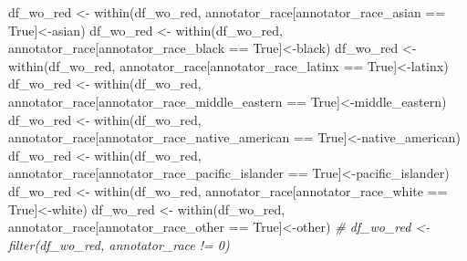 \documentclass[
]{article}
\newenvironment{Shaded}{\begin{snugshade}}{\end{snugshade}}
\newcommand{\CommentTok}[1]{\textcolor[rgb]{0.56,0.35,0.01}{\textit{#1}}}
\newcommand{\FunctionTok}[1]{\textcolor[rgb]{0.00,0.00,0.00}{#1}}
\newcommand{\NormalTok}[1]{#1}
\newcommand{\OtherTok}[1]{\textcolor[rgb]{0.56,0.35,0.01}{#1}}
\newcommand{\SpecialCharTok}[1]{\textcolor[rgb]{0.00,0.00,0.00}{#1}}
\newcommand{\StringTok}[1]{\textcolor[rgb]{0.31,0.60,0.02}{#1}}
\begin{document}
\begin{Shaded}
\begin{Highlighting}[]
\NormalTok{df\_wo\_red }\OtherTok{\textless{}{-}} \FunctionTok{within}\NormalTok{(df\_wo\_red, annotator\_race[annotator\_race\_asian }\SpecialCharTok{==} \StringTok{\textquotesingle{}True\textquotesingle{}}\NormalTok{]}\OtherTok{\textless{}{-}}\StringTok{\textquotesingle{}asian\textquotesingle{}}\NormalTok{)}
\NormalTok{df\_wo\_red }\OtherTok{\textless{}{-}} \FunctionTok{within}\NormalTok{(df\_wo\_red, annotator\_race[annotator\_race\_black }\SpecialCharTok{==} \StringTok{\textquotesingle{}True\textquotesingle{}}\NormalTok{]}\OtherTok{\textless{}{-}}\StringTok{\textquotesingle{}black\textquotesingle{}}\NormalTok{)}
\NormalTok{df\_wo\_red }\OtherTok{\textless{}{-}} \FunctionTok{within}\NormalTok{(df\_wo\_red, annotator\_race[annotator\_race\_latinx }\SpecialCharTok{==} \StringTok{\textquotesingle{}True\textquotesingle{}}\NormalTok{]}\OtherTok{\textless{}{-}}\StringTok{\textquotesingle{}latinx\textquotesingle{}}\NormalTok{)}
\NormalTok{df\_wo\_red }\OtherTok{\textless{}{-}} \FunctionTok{within}\NormalTok{(df\_wo\_red, annotator\_race[annotator\_race\_middle\_eastern }\SpecialCharTok{==} \StringTok{\textquotesingle{}True\textquotesingle{}}\NormalTok{]}\OtherTok{\textless{}{-}}\StringTok{\textquotesingle{}middle\_eastern\textquotesingle{}}\NormalTok{)}
\NormalTok{df\_wo\_red }\OtherTok{\textless{}{-}} \FunctionTok{within}\NormalTok{(df\_wo\_red, annotator\_race[annotator\_race\_native\_american }\SpecialCharTok{==} \StringTok{\textquotesingle{}True\textquotesingle{}}\NormalTok{]}\OtherTok{\textless{}{-}}\StringTok{\textquotesingle{}native\_american\textquotesingle{}}\NormalTok{)}
\NormalTok{df\_wo\_red }\OtherTok{\textless{}{-}} \FunctionTok{within}\NormalTok{(df\_wo\_red, annotator\_race[annotator\_race\_pacific\_islander }\SpecialCharTok{==} \StringTok{\textquotesingle{}True\textquotesingle{}}\NormalTok{]}\OtherTok{\textless{}{-}}\StringTok{\textquotesingle{}pacific\_islander\textquotesingle{}}\NormalTok{)}
\NormalTok{df\_wo\_red }\OtherTok{\textless{}{-}} \FunctionTok{within}\NormalTok{(df\_wo\_red, annotator\_race[annotator\_race\_white }\SpecialCharTok{==} \StringTok{\textquotesingle{}True\textquotesingle{}}\NormalTok{]}\OtherTok{\textless{}{-}}\StringTok{\textquotesingle{}white\textquotesingle{}}\NormalTok{)}
\NormalTok{df\_wo\_red }\OtherTok{\textless{}{-}} \FunctionTok{within}\NormalTok{(df\_wo\_red, annotator\_race[annotator\_race\_other }\SpecialCharTok{==} \StringTok{\textquotesingle{}True\textquotesingle{}}\NormalTok{]}\OtherTok{\textless{}{-}}\StringTok{\textquotesingle{}other\textquotesingle{}}\NormalTok{)}
\CommentTok{\# df\_wo\_red \textless{}{-} filter(df\_wo\_red, annotator\_race != 0)}




\end{Highlighting}
\end{Shaded}
\end{document}
